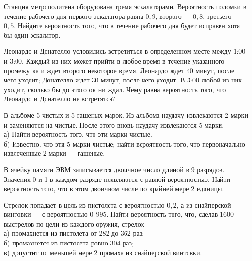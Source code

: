 \newpage\setcounter{zad}{0}



\begin{zkrW}{20}\noindent 
	Станция метрополитена оборудована тремя эскалаторами. Вероятность поломки в течение рабочего дня первого эскалатора равна $0{,}9$, второго --- $0{,}8$, третьего ---  $0{,}5$. Найдите вероятность того, что в течение рабочего дня будет исправен хотя бы один эскалатор.
 
\end{zkrW}

\begin{zkrW}{20}\noindent 
	Леонардо и Донателло условились встретиться в определенном месте между 1:00 и 3:00. Каждый из них может прийти в любое время в течение указанного промежутка и ждет второго некоторое время. Леонардо ждет 40 минут, после чего уходит; Донателло ждет 30 минут, после чего уходит. В 3:00 любой из них уходит, сколько бы до этого он ни ждал. Чему равна вероятность того, что Леонардо и Донателло не встретятся?
 
\end{zkrW}

\begin{zkrW}{20}\noindent 
	В альбоме 5 чистых и 5 гашеных марок. Из альбома наудачу извлекаются 2 марки и заменяются на чистые. После этого вновь наудачу извлекаются 5 марки. \\ \indent а) Найти вероятность того, что эти марки чистые. \\ \indent б) Известно, что эти 5 марки чистые; найти вероятность того, что первоначально извлеченные 2 марки --- гашеные.
 
\end{zkrW}

\begin{zkrW}{20}\noindent 
	В ячейку памяти ЭВМ записывается двоичное число длиной в 9 разрядов. Значения 0 и 1 в каждом разряде появляются с равной вероятностью. Найти вероятность того, что в этом двоичном числе по крайней мере 2 единицы.
 
\end{zkrW}

\begin{zkrW}{20}\noindent 
	Стрелок попадает в цель из пистолета с вероятностью $0{,}2$, а из снайперской винтовки --- с вероятностью $0{,}995$. Найти вероятность того, что, сделав 1600 выстрелов по цели из каждого оружия, стрелок \\ \indent а) промахнется из пистолета от 282 до 362 раз; \\ \indent б) промахнется из пистолета ровно 304 раз; \\ \indent в) допустит по меньшей мере 2 промаха из снайперской винтовки.
 
\end{zkrW}

